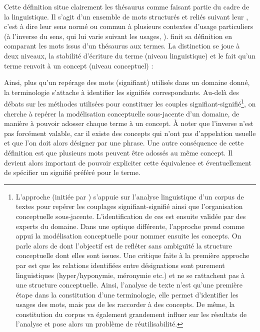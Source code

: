 Cette définition situe clairement les thésaurus comme faisant partie du cadre de la linguistique. 
Il s'agit d'un ensemble de mots structurés et reliés suivant leur , c'est à dire leur sens normé ou commun à plusieurs contextes d'usage particuliers (à l'inverse du sens, qui lui varie suivant les usages, \cite{Roche2005}). 
\citeauthor{bachimont:icc} finit sa définition en comparant les mots issus d'un thésaurus aux termes. La distinction se joue à deux niveaux, la stabilité d'écriture du terme (niveau linguistique) et le fait qu'un terme renvoit à un concept (niveau conceptuel) : 


Ainsi, plus qu'un repérage des mots (signifiant) utilisés dans un domaine donné, la terminologie s'attache à identifier les signifiés correspondants. 
Au-delà des débats sur les méthodes utilisées pour constituer les couples signifiant-signifié\footnote{L'approche  (initiée par \cite{Bourigault1994}) s'appuie sur l'analyse linguistique d'un corpus de textes pour repérer les couplages signifiant-signifié ainsi que l'organisation conceptuelle sous-jacente. L'identification de ces  est ensuite validée par des experts du domaine. 
Dans une optique différente, l'approche  prend comme appui la modélisation conceptuelle pour nommer ensuite les concepts. On parle alors de  dont l'objectif est de refléter sans ambiguïté la structure conceptuelle dont elles sont issues.
Une critique faite à la première approche par \cite{Roche2006} est que les relations identifiées entre désignations sont purement linguistiques (hyper/hyponymie, méronymie etc.) et ne se rattachent pas à une structure conceptuelle. Ainsi, l'analyse de texte n'est qu'une première étape dans la constitution d'une terminologie, elle permet d'identifier les usages des mots, mais pas de les raccorder à des concepts. De même, la constitution du corpus va également grandement influer sur les résultats de l'analyse et pose alors un problème de réutilisabilité.}, on cherche à repérer la modélisation conceptuelle sous-jacente d'un domaine, de manière à pouvoir adosser chaque terme à un concept.
À noter que l'inverse n'est pas forcément valable, car il existe des concepts qui n'ont pas d'appelation usuelle et que l'on doit alors désigner par une phrase. 
Une autre conséquence de cette définition est que plusieurs mots peuvent être adossés au même concept.
Il devient alors important de pouvoir expliciter cette équivalence et éventuellement de spécifier un signifié préféré pour le terme.

